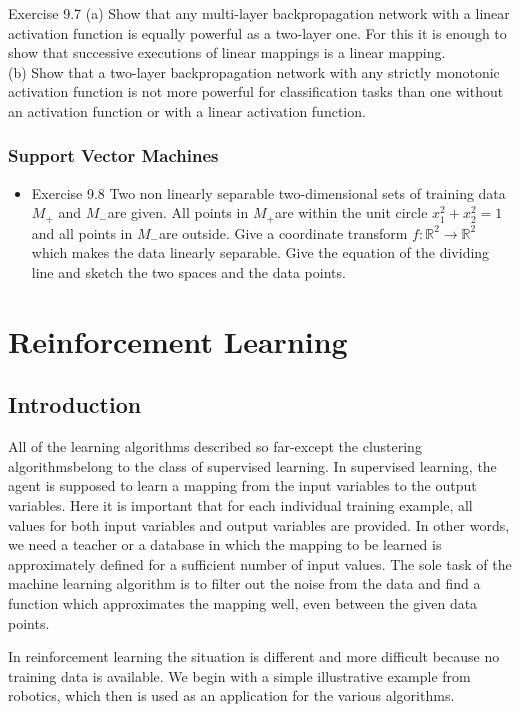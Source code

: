 \documentclass[10pt]{book}
\begin{document}
Exercise 9.7
(a) Show that any multi-layer backpropagation network with a linear activation function is equally powerful as a two-layer one. For this it is enough to show that successive executions of linear mappings is a linear mapping.\\
(b) Show that a two-layer backpropagation network with any strictly monotonic activation function is not more powerful for classification tasks than one without an activation function or with a linear activation function.

\subsection{Support Vector Machines}
\begin{itemize}
  \item Exercise 9.8 Two non linearly separable two-dimensional sets of training data $M_{+}$ and $M_{-}$are given. All points in $M_{+}$are within the unit circle $x_{1}^{2}+x_{2}^{2}=1$ and all points in $M_{-}$are outside. Give a coordinate transform $f: \mathbb{R}^{2} \rightarrow \mathbb{R}^{2}$ which makes the data linearly separable. Give the equation of the dividing line and sketch the two spaces and the data points.
\end{itemize}

\chapter{Reinforcement Learning}
\section{Introduction}
All of the learning algorithms described so far-except the clustering algorithmsbelong to the class of supervised learning. In supervised learning, the agent is supposed to learn a mapping from the input variables to the output variables. Here it is important that for each individual training example, all values for both input variables and output variables are provided. In other words, we need a teacher or a database in which the mapping to be learned is approximately defined for a sufficient number of input values. The sole task of the machine learning algorithm is to filter out the noise from the data and find a function which approximates the mapping well, even between the given data points.


In reinforcement learning the situation is different and more difficult because no training data is available. We begin with a simple illustrative example from robotics, which then is used as an application for the various algorithms.
\end{document}
